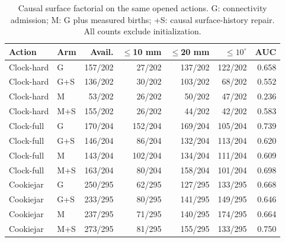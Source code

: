\begin{table}[t]
\centering\scriptsize
\caption{Causal surface factorial on the same opened actions. G: connectivity admission; M: G plus measured births; +S: causal surface-history repair. All counts exclude initialization.}
\label{tab:surface-transactions}
\begin{tabular}{llrrrrr}\toprule
Action & Arm & Avail. & $\leq$10 mm & $\leq$20 mm & $\leq10^\circ$ & AUC\\\midrule
Clock-hard & G & 157/202 & 27/202 & 137/202 & 122/202 & 0.658\\
Clock-hard & G+S & 136/202 & 30/202 & 103/202 & 68/202 & 0.552\\
Clock-hard & M & 53/202 & 26/202 & 50/202 & 47/202 & 0.236\\
Clock-hard & M+S & 155/202 & 26/202 & 44/202 & 42/202 & 0.583\\
Clock-full & G & 170/204 & 152/204 & 169/204 & 105/204 & 0.739\\
Clock-full & G+S & 146/204 & 86/204 & 132/204 & 113/204 & 0.620\\
Clock-full & M & 143/204 & 102/204 & 134/204 & 111/204 & 0.609\\
Clock-full & M+S & 163/204 & 80/204 & 158/204 & 101/204 & 0.698\\
Cookiejar & G & 250/295 & 62/295 & 127/295 & 133/295 & 0.668\\
Cookiejar & G+S & 233/295 & 80/295 & 141/295 & 149/295 & 0.646\\
Cookiejar & M & 237/295 & 71/295 & 140/295 & 174/295 & 0.664\\
Cookiejar & M+S & 273/295 & 81/295 & 155/295 & 133/295 & 0.750\\
\bottomrule\end{tabular}\end{table}
